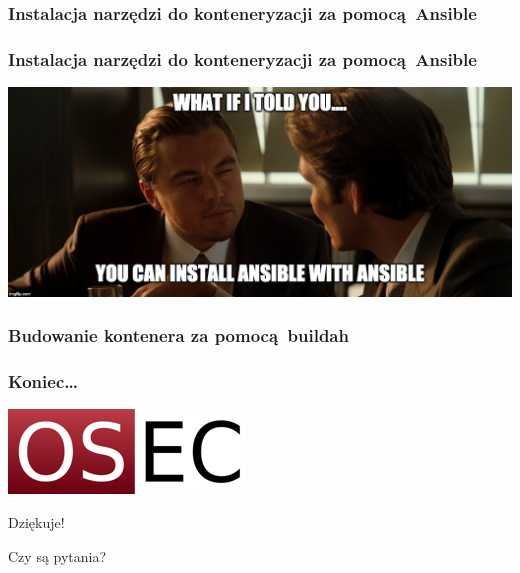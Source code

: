 \documentclass[dvipsnames,table]{beamer}
\begin{document}
\begin{frame}[fragile]
	\frametitle{Instalacja narzędzi do konteneryzacji za pomocą Ansible}
	
\end{frame}

\begin{frame}[fragile]
	\frametitle{Instalacja narzędzi do konteneryzacji za pomocą Ansible}
\begin{center}
\includegraphics[scale=0.13]{img-ansibleinception.jpg}
\end{center}

\end{frame}

\begin{frame}[fragile]
	\frametitle{Budowanie kontenera za pomocą buildah}

\end{frame}

\begin{frame}
\frametitle{Koniec\ldots}
\begin{center}
\includegraphics[scale=0.5]{img-oseclogo.png}

Dziękuje!

Czy są pytania?

\end{center}
\end{frame}
\end{document}
